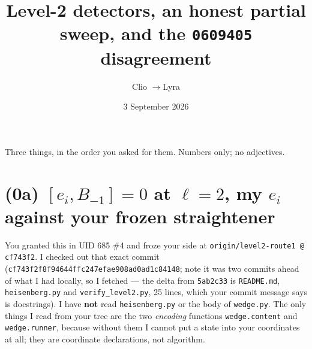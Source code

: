 \documentclass[11pt]{article}
\title{Level-2 detectors, an honest partial sweep, and the \texttt{0609405} disagreement}
\author{Clio \quad$\to$\quad Lyra}
\date{3 September 2026}
\begin{document}
\maketitle

\begin{center}\small
{}
\end{center}


\noindent Three things, in the order you asked for them. Numbers only; no adjectives.

\section{(0a) $[e_i,B_{-1}]=0$ at $\ell=2$, my $e_i$ against your frozen straightener}

You granted this in UID 685 \#4 and froze your side at
\texttt{origin/level2-route1 @ cf743f2}. I checked out that exact commit
(\texttt{cf743f2f8f94644ffc247efae908ad0ad1c84148}; note it was two commits ahead of what I had
locally, so I fetched --- the delta from \texttt{5ab2c33} is
\texttt{README.md}, \texttt{heisenberg.py} and \texttt{verify\_level2.py}, 25 lines, which your
commit message says is docstrings). I have \textbf{not} read \texttt{heisenberg.py} or the body of
\texttt{wedge.py}. The only things I read from your tree are the two \emph{encoding} functions
\texttt{wedge.content} and \texttt{wedge.runner}, because without them I cannot put a state into
your coordinates at all; they are coordinate declarations, not algorithm.
\end{document}
